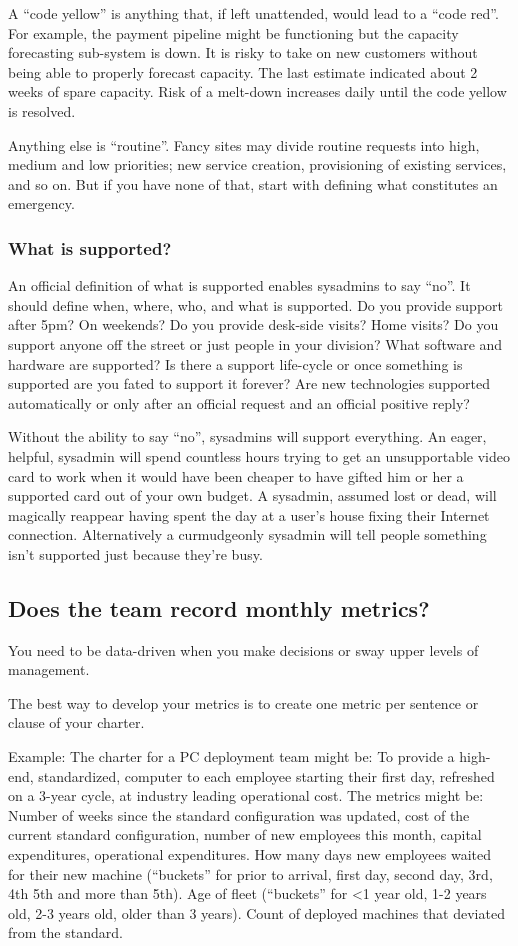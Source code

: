 \documentclass{article}
\begin{document}
A ``code yellow'' is anything that, if left unattended, would lead to a ``code red''. For example, the payment pipeline might be functioning but the capacity forecasting sub-system is down. It is risky to take on new customers without being able to properly forecast capacity. The last estimate indicated about 2 weeks of spare capacity. Risk of a melt-down increases daily until the code yellow is resolved.

Anything else is ``routine''. Fancy sites may divide routine requests into high, medium and low priorities; new service creation, provisioning of existing services, and so on. But if you have none of that, start with defining what constitutes an emergency.

\subsubsection*{What is supported?}
An official definition of what is supported enables sysadmins to say ``no''. It should define when, where, who, and what is supported. Do you provide support after 5pm? On weekends? Do you provide desk-side visits? Home visits? Do you support anyone off the street or just people in your division? What software and hardware are supported? Is there a support life-cycle or once something is supported are you fated to support it forever? Are new technologies supported automatically or only after an official request and an official positive reply?

Without the ability to say ``no'', sysadmins will support everything. An eager, helpful, sysadmin will spend countless hours trying to get an unsupportable video card to work when it would have been cheaper to have gifted him or her a supported card out of your own budget. A sysadmin, assumed lost or dead, will magically reappear having spent the day at a user's house fixing their Internet connection. Alternatively a curmudgeonly sysadmin will tell people something isn't supported just because they're busy.

\subsection{Does the team record monthly metrics?}
You need to be data-driven when you make decisions or sway upper levels of management.

The best way to develop your metrics is to create one metric per sentence or clause of your charter.

Example: The charter for a PC deployment team might be: To provide a high-end, standardized, computer to each employee starting their first day, refreshed on a 3-year cycle, at industry leading operational cost. The metrics might be: Number of weeks since the standard configuration was updated, cost of the current standard configuration, number of new employees this month, capital expenditures, operational expenditures. How many days new employees waited for their new machine (``buckets'' for prior to arrival, first day, second day, 3rd, 4th 5th and more than 5th). Age of fleet (``buckets'' for <1 year old, 1-2 years old, 2-3 years old, older than 3 years). Count of deployed machines that deviated from the standard.
\end{document}
